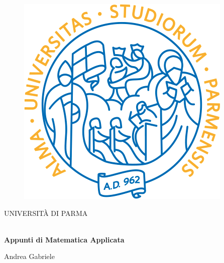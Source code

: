 
\begin{titlepage}
    \begin{figure}[!htb]
        \centering
        \includegraphics[keepaspectratio=true,scale=0.5]{uniprLogo.png}
    \end{figure}
    \begin{center}
        \LARGE{UNIVERSITÀ DI PARMA}
        \vspace{5mm}
        \\ \large{\Dipartimento}
        \vspace{5mm}
        \\ \LARGE{\Corso}
    \end{center}
    \vspace{20mm}
    \begin{center}
        {\LARGE{\textbf{Appunti di Matematica Applicata}}}
    \end{center}
    \vspace{55mm}
    \begin{center}
        {\LARGE{Andrea Gabriele}}
    \end{center}
    \hrulefill
    \vspace{2mm}
    \\
    
    
    \end{titlepage}
    
    
    \clearpage
    
    \fancyhead{}\fancyfoot{}
    \fancyhead[L]{\Insegnamento}
    \fancyhead[R]{\theauthor}
    
    \fancyfoot[R]{\thepage}